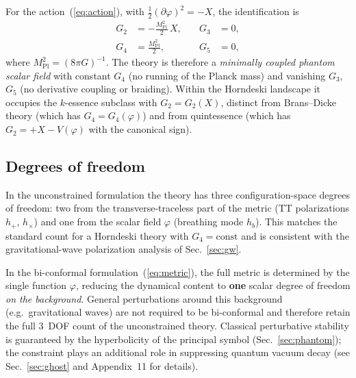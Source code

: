 \documentclass[aps,prd,onecolumn,superscriptaddress,nofootinbib,showpacs,12pt]{revtex4-2}
\newcommand{\Mpl}{M_{\mathrm{Pl}}}
\begin{document}
For the action~(\ref{eq:action}), with
$\frac{1}{2}(\partial\varphi)^{2} = -X$, the identification
is
\begin{equation}\label{eq:horndeski_map}
  \boxed{
  \begin{aligned}
    G_{2} &= -\frac{\Mpl^{2}}{2}\,X,
    &\quad G_{3} &= 0,\\[4pt]
    G_{4} &= \frac{\Mpl^{2}}{2},
    &\quad G_{5} &= 0,
  \end{aligned}
  }
\end{equation}
where $\Mpl^{2} = (8\pi G)^{-1}$.  The theory is therefore
a \emph{minimally coupled phantom scalar field} with
constant $G_{4}$ (no running of the Planck mass) and
vanishing $G_{3}$, $G_{5}$ (no derivative coupling or
braiding).  Within the Horndeski landscape it occupies
the $k$-essence subclass with $G_{2} = G_{2}(X)$, distinct
from Brans--Dicke theory (which has $G_{4} = G_{4}(\varphi)$)
and from quintessence (which has $G_{2} = +X - V(\varphi)$
with the canonical sign).

\subsection{Degrees of freedom}\label{sec:dof}

In the unconstrained formulation the theory has three
configuration-space degrees of freedom: two from the
transverse-traceless part of the metric (TT
polarizations $h_{+}$, $h_{\times}$) and one from the
scalar field $\varphi$ (breathing mode $h_{b}$).
This matches the standard count for a Horndeski theory
with $G_{4} = \mathrm{const}$ and is consistent with the
gravitational-wave polarization analysis of
Sec.~\ref{sec:gw}.

In the bi-conformal formulation~(\ref{eq:metric}),
the full metric is determined by the single
function $\varphi$, reducing the dynamical content to
\textbf{one} scalar degree of freedom \emph{on the
background}.  General perturbations around this background
(e.g.\ gravitational waves) are not required to be
bi-conformal and therefore retain the full 3~DOF
count of the unconstrained theory.  Classical perturbative
stability is guaranteed by the hyperbolicity of the
principal symbol (Sec.~\ref{sec:phantom}); the constraint
plays an additional role in suppressing quantum vacuum
decay (see Sec.~\ref{sec:ghost} and Appendix~11 for
details).

\end{document}
